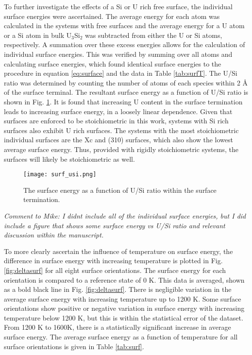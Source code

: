 \documentclass[review]{elsarticle}
\begin{document}
\FloatBarrier

To further investigate the effects of a Si or U rich free surface, the individual surface energies were ascertained. The average energy for each atom was calculated in the systems with free surfaces and the average energy for a U atom or a Si atom in bulk U$_3$Si$_2$ was subtracted from either the U or Si atoms, respectively. A summation over these excess energies allows for the calculation of individual surface energies. This was verified by summing over all atoms and calculating surface energies, which found identical surface energies to the procedure in equation \ref{eq:surface} and the data in Table \ref{tab:surfT}. The U/Si ratio was determined by counting the number of atoms of each species within 2 {\AA} of the surface terminal. The resultant surface energy as a function of U/Si ratio is shown in Fig. \ref{fig:surfusi}. It is found that increasing U content in the surface termination leads to increasing surface energy, in a loosely linear dependence. Given that surfaces are enforced to be stoichiometric in this work, systems with Si rich surfaces also exhibit U rich surfaces. The systems with the most stoichiometric individual surfaces are the Xc and (310) surfaces, which also show the lowest average surface energy. Thus, provided with rigidly stoichiometric systems, the surfaces will likely be stoichiometric as well. 

\begin{figure}[h]
 \centering
 \texttt{[image: surf\_usi.png]} 
 \caption{The surface energy as a function of U/Si ratio within the surface termination. }
 \label{fig:surfusi}
\end{figure}

\FloatBarrier

\textit{\color{blue}Comment to Mike: I didnt include all of the individual surface energies, but I did include a figure that shows some surface energy vs U/Si ratio and relevant discussion within the manuscript. } 



To more clearly ascertain the influence of temperature on surface energy, the difference in surface energy with increasing temperature is plotted in Fig. \ref{fig:deltasurf} for all eight surface orientations. The surface energy for each orientation is compared to a reference state of 0 K. This data is averaged, shown as a bold black line in Fig. \ref{fig:deltasurf}. There is negligible variation in the average surface energy with increasing temperature up to 1200 K. Some surface orientations show positive or negative variation in surface energy with increasing temperature below 1200 K, but this is within the statistical error of the dataset. From 1200 K to 1600K, there is a statistically significant increase in average surface energy. The average surface energy as a function of temperature for all surface orientations is given in Table \ref{tab:surf}. 
\end{document}
